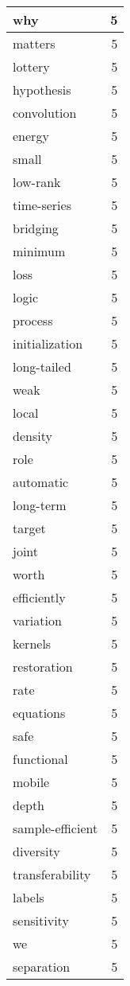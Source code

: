 \begin{table}[h]
\begin{tabular}{|l|r|}
\hline
why & 5 \\
\hline
matters & 5 \\
\hline
lottery & 5 \\
\hline
hypothesis & 5 \\
\hline
convolution & 5 \\
\hline
energy & 5 \\
\hline
small & 5 \\
\hline
low-rank & 5 \\
\hline
time-series & 5 \\
\hline
bridging & 5 \\
\hline
minimum & 5 \\
\hline
loss & 5 \\
\hline
logic & 5 \\
\hline
process & 5 \\
\hline
initialization & 5 \\
\hline
long-tailed & 5 \\
\hline
weak & 5 \\
\hline
local & 5 \\
\hline
density & 5 \\
\hline
role & 5 \\
\hline
automatic & 5 \\
\hline
long-term & 5 \\
\hline
target & 5 \\
\hline
joint & 5 \\
\hline
worth & 5 \\
\hline
efficiently & 5 \\
\hline
variation & 5 \\
\hline
kernels & 5 \\
\hline
restoration & 5 \\
\hline
rate & 5 \\
\hline
equations & 5 \\
\hline
safe & 5 \\
\hline
functional & 5 \\
\hline
mobile & 5 \\
\hline
depth & 5 \\
\hline
sample-efficient & 5 \\
\hline
diversity & 5 \\
\hline
transferability & 5 \\
\hline
labels & 5 \\
\hline
sensitivity & 5 \\
\hline
we & 5 \\
\hline
separation & 5 \\

\end{tabular}
\end{table}
